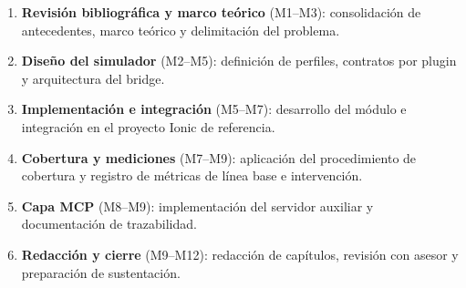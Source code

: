 \begin{enumerate}
    \item \textbf{Revisión bibliográfica y marco teórico} (M1--M3): consolidación de antecedentes, marco teórico y delimitación del problema.
    \item \textbf{Diseño del simulador} (M2--M5): definición de perfiles, contratos por plugin y arquitectura del bridge.
    \item \textbf{Implementación e integración} (M5--M7): desarrollo del módulo e integración en el proyecto Ionic de referencia.
    \item \textbf{Cobertura y mediciones} (M7--M9): aplicación del procedimiento de cobertura y registro de métricas de línea base e intervención.
    \item \textbf{Capa MCP} (M8--M9): implementación del servidor auxiliar y documentación de trazabilidad.
    \item \textbf{Redacción y cierre} (M9--M12): redacción de capítulos, revisión con asesor y preparación de sustentación.
\end{enumerate}
